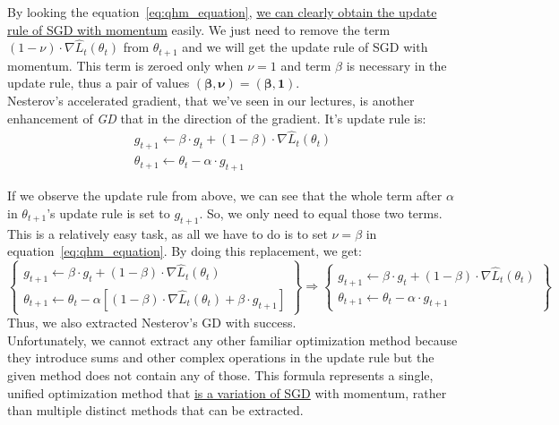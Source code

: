 By looking the equation~\ref{eq:qhm_equation}, \underline{we can clearly obtain the update rule of SGD with momentum} easily. We just need to remove the term $\left(1 -\nu \right) \cdot \nabla \hat{L}_{t}\left(\theta_{t}\right)$ from $\theta_{t+1}$ and we will get the update rule of SGD with momentum.
This term is zeroed only when $\nu = 1$ and term $\beta$ is necessary in the update rule, thus a pair of values $\mathbf{\left(\beta, \nu\right) = \left(\beta, 1\right)}$.\\

Nesterov's accelerated gradient, that we've seen in our lectures, is another enhancement of \textit{GD} that  in the direction of the gradient. It's update rule is:
\[
\begin{array}{l}
	g_{t+1} \leftarrow \beta \cdot g_t + \left(1 - \beta \right) \cdot \nabla \hat{L}_t \left(\theta_t\right) \\ 
	\theta_{t+1} \leftarrow \theta_{t} - \alpha \cdot g_{t+1}
\end{array}
\]

If we observe the update rule from above, we can see that the whole term after $\alpha$ in $\theta_{t+1}$'s update rule is set to $g_{t+1}$. So, we only need to equal those two terms. This is a relatively easy task, as all we have to do is to set $\nu = \beta$ in equation~\ref{eq:qhm_equation}. By doing this replacement, we get:
\[
\left\{
\begin{array}{l}
	g_{t+1} \leftarrow \beta \cdot g_t + \left(1-\beta\right) \cdot \nabla \hat{L}_t \left(\theta_{t}\right) \\ 
	\theta_{t+1} \leftarrow \theta_{t} - \alpha \left[ \left(1-\beta\right) \cdot \nabla \hat{L}_t \left(\theta_{t}\right) + \beta \cdot g_{t+1} \right]
\end{array}
\right\} \Rightarrow
\left\{
\begin{array}{l}
	g_{t+1} \leftarrow \beta \cdot g_t + \left(1-\beta\right) \cdot \nabla \hat{L}_t \left(\theta_{t}\right) \\ 
	\theta_{t+1} \leftarrow \theta_{t} - \alpha \cdot g_{t+1}
\end{array}
\right\}
\]
Thus, we also extracted Nesterov's GD with success.\\

Unfortunately, we cannot extract any other familiar optimization method because they introduce sums and other complex operations in the update rule but the given method does not contain any of those. This formula represents a single, unified optimization method that \underline{is a variation of SGD} with momentum, rather than multiple distinct methods that can be extracted.
\vspace{3mm}
